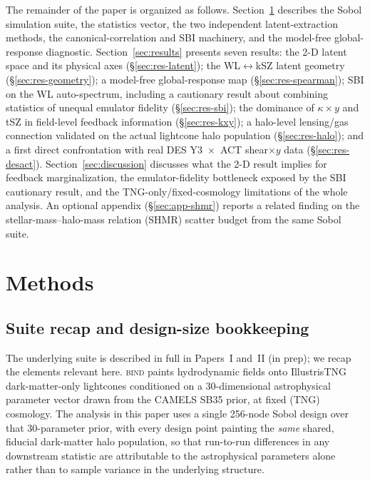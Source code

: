 \documentclass[11pt]{article}
\newcommand{\bind}{\textsc{bind}}
\newcommand{\kappay}{\kappa\times y}
\begin{document}
The remainder of the paper is organized as follows. Section~\ref{sec:methods}
describes the Sobol simulation suite, the statistics vector, the two
independent latent-extraction methods, the canonical-correlation and SBI
machinery, and the model-free global-response diagnostic.
Section~\ref{sec:results} presents seven results: the 2-D latent space and
its physical axes (\S\ref{sec:res-latent}); the WL$\leftrightarrow$kSZ
latent geometry (\S\ref{sec:res-geometry}); a model-free global-response
map (\S\ref{sec:res-spearman}); SBI on the WL auto-spectrum, including a
cautionary result about combining statistics of unequal emulator fidelity
(\S\ref{sec:res-sbi}); the dominance of $\kappay$ and tSZ in field-level
feedback information (\S\ref{sec:res-kxy}); a halo-level lensing/gas
connection validated on the actual lightcone halo population
(\S\ref{sec:res-halo}); and a first direct confrontation with real DES
Y3~$\times$~ACT shear$\times y$ data (\S\ref{sec:res-desact}).
Section~\ref{sec:discussion} discusses what the 2-D result implies for
feedback marginalization, the emulator-fidelity bottleneck exposed by the
SBI cautionary result, and the TNG-only/fixed-cosmology limitations of the
whole analysis. An optional appendix (\S\ref{sec:app-shmr}) reports a
related finding on the stellar-mass--halo-mass relation (SHMR) scatter
budget from the same Sobol suite.

\section{Methods}\label{sec:methods}

\subsection{Suite recap and design-size bookkeeping}\label{sec:methods-suite}

The underlying suite is described in full in Papers~I and~II (in prep);
we recap the elements relevant here. \bind{} paints hydrodynamic fields
onto IllustrisTNG dark-matter-only lightcones conditioned on a
30-dimensional astrophysical parameter vector drawn from the CAMELS SB35
prior, at fixed (TNG) cosmology. %
The analysis in this paper uses a single 256-node Sobol design over that
30-parameter prior, with every design point painting the \emph{same}
shared, fiducial dark-matter halo population, so that run-to-run
differences in any downstream statistic are attributable to the
astrophysical parameters alone rather than to sample variance in the
underlying structure. %
\end{document}
